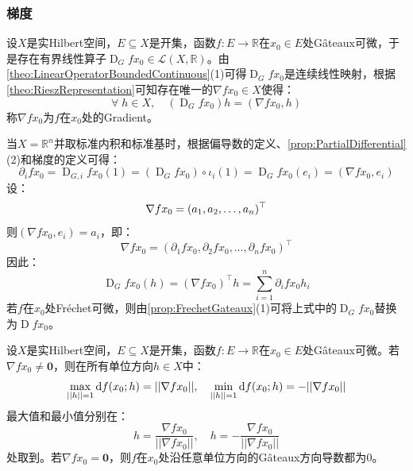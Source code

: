 \subsubsection{梯度}
\begin{definition}
	设$X$是实Hilbert空间，$E\subseteq X$是开集，函数$f:E\to\mathbb{R}$在$x_0\in E$处G\^ateaux可微，于是存在有界线性算子$\operatorname{D}_Gfx_0\in\mathcal{L}(X,\mathbb{R})$。由\cref{theo:LinearOperatorBoundedContinuous}(1)可得$\operatorname{D}_Gfx_0$是连续线性映射，根据\cref{theo:RieszRepresentation}可知存在唯一的$\nabla fx_0\in X$使得：
	\begin{equation*}
		\forall\;h\in X,\quad(\operatorname{D}_Gfx_0)h=(\nabla fx_0,h)
	\end{equation*}
	称$\nabla fx_0$为$f$在$x_0$处的\gls{Gradient}。
\end{definition}
\begin{note}
	当$X=\mathbb{R}^n$并取标准内积和标准基时，根据偏导数的定义、\cref{prop:PartialDifferential}(2)和梯度的定义可得：
	\begin{equation*}
		\partial_ifx_0=\operatorname{D}_{G,i}fx_0(1)=(\operatorname{D}_Gfx_0)\circ\iota_i(1)=\operatorname{D}_Gfx_0(e_i)=(\nabla fx_0,e_i)
	\end{equation*}
	设：
	\begin{equation*}
		\nabla fx_0=(a_1, a_2, \dots, a_{n})^{\top}
	\end{equation*}
	则$(\nabla fx_0,e_i)=a_i$，即：
	\begin{equation*}
		\nabla fx_0=(\partial_1fx_0,\partial_2fx_0,\dots,\partial_nfx_0)^{\top}
	\end{equation*}
	因此：
	\begin{equation*}
		\operatorname{D}_Gfx_0(h)=(\nabla fx_0)^{\top}h=\sum_{i=1}^{n}\partial_ifx_0h_i
	\end{equation*}
	若$f$在$x_0$处Fr\'echet可微，则由\cref{prop:FrechetGateaux}(1)可将上式中的$\operatorname{D}_Gfx_0$替换为$\operatorname{D}fx_0$。
\end{note}
\begin{property}\label{prop:Gradient}
	设$X$是实Hilbert空间，$E\subseteq X$是开集，函数$f:E\to\mathbb{R}$在$x_0\in E$处G\^ateaux可微。若$\nabla fx_0\ne\mathbf{0}$，则在所有单位方向$h\in X$中：
	\begin{equation*}
		\max_{||h||=1}\mathop{}\!\mathrm{d} f(x_0;h)=||\nabla fx_0||,\quad
		\min_{||h||=1}\mathop{}\!\mathrm{d} f(x_0;h)=-||\nabla fx_0||
	\end{equation*}
	最大值和最小值分别在：
	\begin{equation*}
		h=\frac{\nabla fx_0}{||\nabla fx_0||},\quad
		h=-\frac{\nabla fx_0}{||\nabla fx_0||}
	\end{equation*}
	处取到。若$\nabla fx_0=\mathbf{0}$，则$f$在$x_0$处沿任意单位方向的G\^ateaux方向导数都为$0$。
\end{property}
